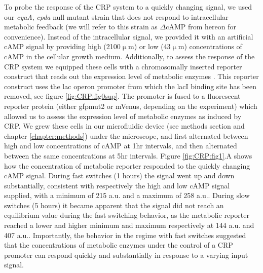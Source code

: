 To probe the response of the CRP system to a quickly changing signal, 
we used
our \textit{cyaA}, \textit{cpda} null mutant strain that does not respond to intracellular metabolic feedback (we will refer to this strain as $\Delta$cAMP from hereon for convenience).
Instead of the intracellular signal, we provided it with an artificial cAMP signal by providing high (2100$\upmu$m) or low (43$\upmu$m) concentrations of cAMP in the cellular growth medium.
%
Additionally, 
to assess the response of the CRP system we equipped these cells with a chromosomally inserted reporter construct that reads out the expression level of metabolic enzymes \cite{Towbin2017}.
%
%
%
This reporter construct uses the lac operon promoter from which the lacI binding site has been removed, see figure \ref{fig:CRP:fig0sup}.
The promoter is fused to a fluorescent reporter protein (either gfpmut2 or mVenus, depending on the experiment) which allowed us to
assess
the expression level of metabolic enzymes as induced by CRP.
%
%
%
%
We grew these cells in our microfluidic device (see methods section and chapter \ref{chapter:methods}) under the microscope, and 
first alternated between high and low concentrations of cAMP at 1hr intervals, and then alternated between the same concentrations at 5hr intervals.
%
Figure \ref{fig:CRP:fig1}.A shows how the concentration of metabolic reporter responded to the quickly changing cAMP signal. 
%
During fast switches (1 hours) the signal went up and down substantially, consistent with respectively the high and low cAMP signal supplied, with a minimum of 215 a.u. and a maximum of 258 a.u..
%
During slow switches (5 hours) it became apparent that the signal did not reach an equilibrium value during the fast switching behavior, as the metabolic reporter reached a lower and higher minimum and maximum respectively at 144 a.u. and 407 a.u.. 
%
Importantly, the behavior in the regime with fast switches suggested that the concentrations of metabolic enzymes under the control of a CRP promoter can respond quickly and substantially in response to a varying input signal. 
 


